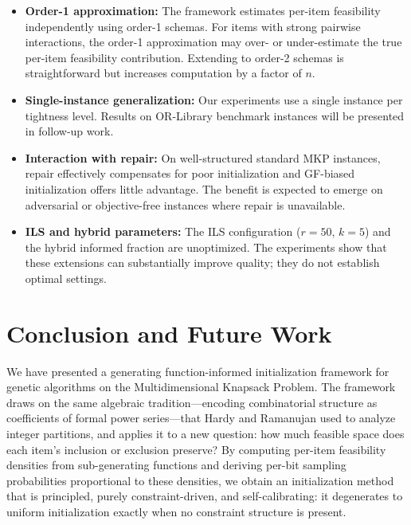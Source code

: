 \documentclass[twocolumn]{article}
\begin{document}
\begin{itemize}
    \item \textbf{Order-1 approximation:} The framework estimates 
    per-item feasibility independently using order-1 schemas. For items 
    with strong pairwise interactions, the order-1 approximation may 
    over- or under-estimate the true per-item feasibility contribution. 
    Extending to order-2 schemas is straightforward but increases 
    computation by a factor of $n$.
    \item \textbf{Single-instance generalization:} Our experiments use 
    a single instance per tightness level. Results on OR-Library 
    benchmark instances will be presented in follow-up work.
    \item \textbf{Interaction with repair:} On well-structured standard 
    MKP instances, repair effectively compensates for poor initialization 
    and GF-biased initialization offers little advantage. The benefit is 
    expected to emerge on adversarial or objective-free instances where 
    repair is unavailable.
    \item \textbf{ILS and hybrid parameters:} The ILS configuration 
    ($r = 50$, $k = 5$) and the hybrid informed fraction are unoptimized. 
    The experiments show that these extensions can substantially improve 
    quality; they do not establish optimal settings.
\end{itemize}

\section{Conclusion and Future Work}
\label{sec:conclusion}

We have presented a generating function-informed initialization framework 
for genetic algorithms on the Multidimensional Knapsack Problem. The 
framework draws on the same algebraic tradition---encoding combinatorial 
structure as coefficients of formal power series---that Hardy and Ramanujan 
used to analyze integer partitions, and applies it to a new question: 
how much feasible space does each item's inclusion or exclusion preserve? 
By computing per-item feasibility densities from sub-generating functions 
and deriving per-bit sampling probabilities proportional to these densities, 
we obtain an initialization method that is principled, purely 
constraint-driven, and self-calibrating: it degenerates to uniform 
initialization exactly when no constraint structure is present.
\end{document}

